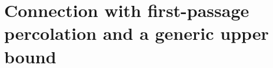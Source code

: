 \documentclass{patmorin}
\DeclareMathOperator{\exponential}{exponential}
\begin{document}
\section{Connection with first-passage percolation and a generic upper bound}

%
%
%
%
\end{document}
